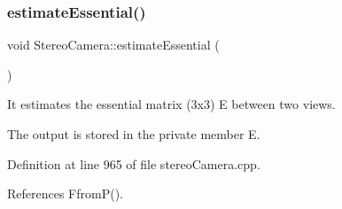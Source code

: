 \subsubsection{\texorpdfstring{estimate\+Essential()}{estimateEssential()}}
{\footnotesize\ttfamily void Stereo\+Camera\+::estimate\+Essential (\begin{DoxyParamCaption}{ }\end{DoxyParamCaption})}



It estimates the essential matrix (3x3) E between two views. 

The output is stored in the private member E. 

Definition at line 965 of file stereo\+Camera.\+cpp.



References Ffrom\+P().



